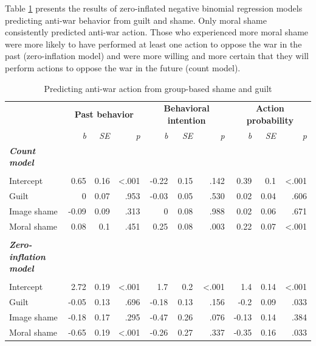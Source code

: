\documentclass[
]{article}
\begin{document}
Table \ref{tab:TableS3} presents the results of zero-inflated negative binomial regression models predicting anti-war behavior from guilt and shame. Only moral shame consistently predicted anti-war action. Those who experienced more moral shame were more likely to have performed at least one action to oppose the war in the past (zero-inflation model) and were more willing and more certain that they will perform actions to oppose the war in the future (count model).

\begin{table}[H]
\centering
\caption{\label{tab:TableS3}Predicting anti-war action from group-based shame and guilt}
\centering
\fontsize{8}{10}\selectfont
\begin{tabular}[t]{lrrrrrrrrr}
\toprule
\multicolumn{1}{c}{\textbf{}} & \multicolumn{3}{c}{\textbf{Past behavior}} & \multicolumn{3}{c}{\textbf{Behavioral intention}} & \multicolumn{3}{c}{\textbf{Action probability}} \\
\cmidrule(l{3pt}r{3pt}){2-4} \cmidrule(l{3pt}r{3pt}){5-7} \cmidrule(l{3pt}r{3pt}){8-10}
\em{ } & \em{b} & \em{SE} & \em{p} & \em{b} & \em{SE} & \em{p} & \em{b} & \em{SE} & \em{p}\\
\midrule
\em{\textbf{Count model}} & \em{\textbf{}} & \em{\textbf{}} & \em{\textbf{}} & \em{\textbf{}} & \em{\textbf{}} & \em{\textbf{}} & \em{\textbf{}} & \em{\textbf{}} & \em{\textbf{}}\\
\midrule\\
Intercept & 0.65 & 0.16 & <.001 & -0.22 & 0.15 & .142 & 0.39 & 0.1 & <.001\\
Guilt & 0 & 0.07 & .953 & -0.03 & 0.05 & .530 & 0.02 & 0.04 & .606\\
Image shame & -0.09 & 0.09 & .313 & 0 & 0.08 & .988 & 0.02 & 0.06 & .671\\
Moral shame & 0.08 & 0.1 & .451 & 0.25 & 0.08 & .003 & 0.22 & 0.07 & <.001\\
\midrule\\
\addlinespace
\em{\textbf{Zero-inflation model}} & \em{\textbf{}} & \em{\textbf{}} & \em{\textbf{}} & \em{\textbf{}} & \em{\textbf{}} & \em{\textbf{}} & \em{\textbf{}} & \em{\textbf{}} & \em{\textbf{}}\\
\midrule\\
Intercept & 2.72 & 0.19 & <.001 & 1.7 & 0.2 & <.001 & 1.4 & 0.14 & <.001\\
Guilt & -0.05 & 0.13 & .696 & -0.18 & 0.13 & .156 & -0.2 & 0.09 & .033\\
Image shame & -0.18 & 0.17 & .295 & -0.47 & 0.26 & .076 & -0.13 & 0.14 & .384\\
Moral shame & -0.65 & 0.19 & <.001 & -0.26 & 0.27 & .337 & -0.35 & 0.16 & .033\\
\bottomrule
\end{tabular}
\end{table}
\end{document}
